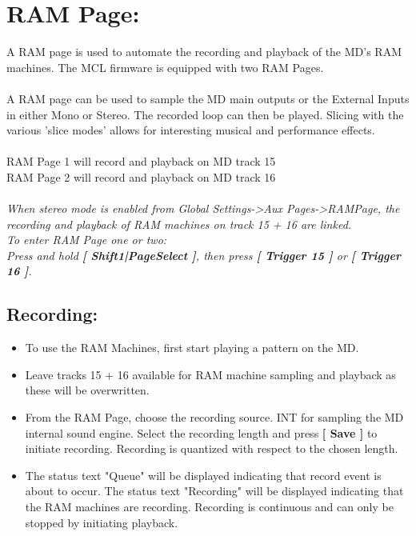 \chapter{RAM Page:}
A RAM page is used to automate the recording and playback of the MD's RAM machines. The MCL firmware is equipped with two RAM Pages.
\\\\
A RAM page can be used to sample the MD main outputs or the External Inputs in either Mono or Stereo. The recorded loop can then be played.
Slicing with the various 'slice modes' allows for interesting musical and performance effects.
\\\\
RAM Page 1 will record and playback on MD track 15\\
RAM Page 2 will record and playback on MD track 16\\
\\
\textit{When stereo mode is enabled from Global Settings->Aux Pages->RAMPage, the recording and playback of RAM machines on track 15 + 16 are linked.}
\\
\textit{To enter RAM Page one or two: \\Press and hold
\textbf{[ Shift1|PageSelect ]}, then press \textbf{[ Trigger 15 ]} or \textbf{[ Trigger 16 ]}.}

\newpage
\section{Recording:}
\begin{itemize}
    \item{To use the RAM Machines, first start playing a pattern on the MD.}
    \item{Leave tracks 15 + 16 available for RAM machine sampling and playback as these will be overwritten.}
    \item{From the RAM Page, choose the recording source. INT for sampling the MD internal sound engine. Select the recording length and press \textbf{[ Save ]} to initiate recording. Recording is quantized with respect to the chosen length.}
    \item The status text "Queue" will be displayed indicating that record event is about to occur. The status text "Recording" will be displayed indicating that the RAM machines are recording. Recording is continuous and can only be stopped by initiating playback.
\end{itemize}

